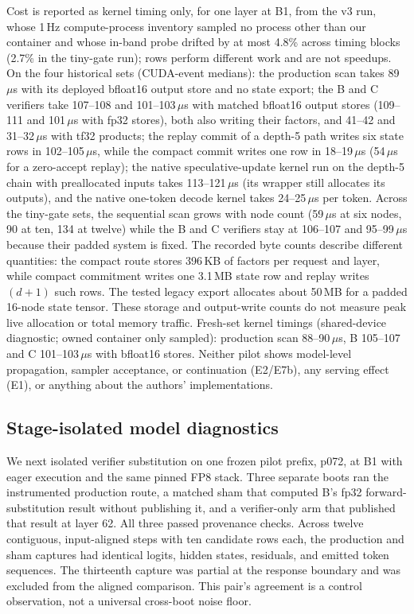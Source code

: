 \documentclass[conference]{IEEEtran}
\begin{document}
Cost is reported as kernel timing only, for one layer at B1, from the v3 run, whose 1\,Hz compute-process inventory sampled no process other than our container and whose in-band probe drifted by at most 4.8\% across timing blocks (2.7\% in the tiny-gate run); rows perform different work and are not speedups. On the four historical sets (CUDA-event medians): the production scan takes 89\,$\mu$s with its deployed bfloat16 output store and no state export; the B and C verifiers take 107--108 and 101--103\,$\mu$s with matched bfloat16 output stores (109--111 and 101\,$\mu$s with fp32 stores), both also writing their factors, and 41--42 and 31--32\,$\mu$s with tf32 products; the replay commit of a depth-5 path writes six state rows in 102--105\,$\mu$s, while the compact commit writes one row in 18--19\,$\mu$s (54\,$\mu$s for a zero-accept replay); the native speculative-update kernel run on the depth-5 chain with preallocated inputs takes 113--121\,$\mu$s (its wrapper still allocates its outputs), and the native one-token decode kernel takes 24--25\,$\mu$s per token. Across the tiny-gate sets, the sequential scan grows with node count (59\,$\mu$s at six nodes, 90 at ten, 134 at twelve) while the B and C verifiers stay at 106--107 and 95--99\,$\mu$s because their padded system is fixed. The recorded byte counts describe different quantities: the compact route stores 396\,KB of factors per request and layer, while compact commitment writes one 3.1\,MB state row and replay writes $(d{+}1)$ such rows. The tested legacy export allocates about 50\,MB for a padded 16-node state tensor. These storage and output-write counts do not measure peak live allocation or total memory traffic. Fresh-set kernel timings (shared-device diagnostic; owned container only sampled): production scan 88--90\,$\mu$s, B 105--107 and C 101--103\,$\mu$s with bfloat16 stores. Neither pilot shows model-level propagation, sampler acceptance, or continuation (E2/E7b), any serving effect (E1), or anything about the authors' implementations.

\subsection{Stage-isolated model diagnostics}
\label{sec:e7b-diagnostic}
We next isolated verifier substitution on one frozen pilot prefix, p072, at B1 with eager execution and the same pinned FP8 stack. Three separate boots ran the instrumented production route, a matched sham that computed B's fp32 forward-substitution result without publishing it, and a verifier-only arm that published that result at layer 62. All three passed provenance checks. Across twelve contiguous, input-aligned steps with ten candidate rows each, the production and sham captures had identical logits, hidden states, residuals, and emitted token sequences. The thirteenth capture was partial at the response boundary and was excluded from the aligned comparison. This pair's agreement is a control observation, not a universal cross-boot noise floor.
\end{document}
